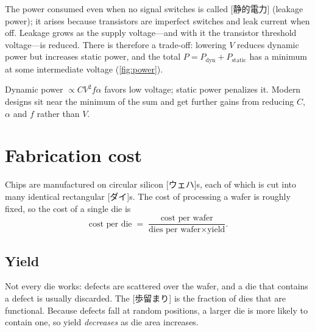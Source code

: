 \documentclass[../main.tex]{subfiles}
\begin{document}
The power consumed even when no signal switches is called
[静的電力] (leakage power); it arises because transistors are imperfect switches and leak current
when off.  Leakage grows as the supply voltage---and with it the transistor
threshold voltage---is reduced.  There is therefore a trade-off: lowering
$V$ reduces dynamic power but increases static power, and the total
$P = P_{\mathrm{dyn}} + P_{\mathrm{static}}$ has a minimum at some
intermediate voltage (\cref{fig:power}).

\begin{marginfigure}
  \resizebox{\linewidth}{!}{}
  \caption{Dynamic and static power pull in opposite directions as the
    supply voltage changes.}
  \label{fig:power}
\end{marginfigure}

\begin{keypoint}[Power]
  Dynamic power $\propto C V^{2} f \alpha$ favors low voltage; static power
  penalizes it.  Modern designs sit near the minimum of the sum and get
  further gains from reducing $C$, $\alpha$ and $f$ rather than $V$.
\end{keypoint}

\section{Fabrication cost}

Chips are manufactured on circular silicon [ウェハ]s, each of
which is cut into many identical rectangular [ダイ]s.  The cost of
processing a wafer is roughly fixed, so the cost of a single die
is
\begin{equation}
  \text{cost per die} \;=\;
  \frac{\text{cost per wafer}}
       {\text{dies per wafer} \times \text{yield}} .
  \label{eq:die-cost}
\end{equation}

\subsection{Yield}

Not every die works: defects are scattered over the wafer, and a die that
contains a defect is usually discarded.  The [歩留まり] is the
fraction of dies that are functional.  Because defects fall at random
positions, a larger die is more likely to contain one, so yield
\emph{decreases} as die area increases.
\end{document}

